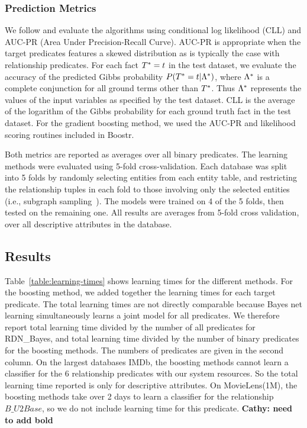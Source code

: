 \documentclass[runningheads,a4paper]{llncs}
\begin{document}
\subsubsection{Prediction Metrics}
We follow \cite{Khot2011} and evaluate the algorithms using conditional log likelihood (CLL) and AUC-PR (Area Under Precision-Recall Curve). AUC-PR is appropriate when the target predicates features a skewed distribution as is typically the case with relationship predicates. %
For each fact $T^{*}\hspace{0.0ex} = t$ in the test dataset, we evaluate the accuracy of the predicted Gibbs probability $P(T^{*}\hspace{0.0ex} = t | \Lambda^{*}\hspace{0.0ex})$, where $\Lambda^{*}\hspace{0.0ex}$ is a complete conjunction for all ground terms other than $T^{*}\hspace{0.0ex}$. Thus $\Lambda^{*}\hspace{0.0ex}$ represents the values of the input variables as specified by the test dataset.
CLL is the average of the logarithm of the Gibbs probability for each ground truth fact in the test dataset. For the gradient boosting method, we used the AUC-PR and likelihood scoring routines included in Boostr.


Both metrics are reported as averages over all binary predicates. The learning methods were evaluated using 5-fold cross-validation. Each database was split into 5 folds by randomly selecting entities from each entity table, and restricting the relationship tuples in each fold to those involving only the selected entities  (i.e., subgraph sampling~\cite{Schulte2012}). The models were trained on 4 of the 5 folds, then tested on the remaining one. All results are averages from 5-fold cross validation, over all descriptive attributes in the database. 


\subsection{Results} 
%
Table~\ref{table:learning-times} shows learning times for the different methods. For the boosting method, we added together the learning times for each target predicate. The total learning times are not directly comparable because Bayes net learning simultaneously learns a joint model for all predicates. We therefore report total learning time divided by the number of all predicates for RDN\_Bayes, and total learning time divided by the number of binary predicates for the boosting methods. The numbers of predicates are given in the second column. On the largest databases IMDb, the boosting methods cannot learn a classifier for the 6 relationship predicates with our system resources. So the total learning time reported is only for descriptive attributes. On MovieLens(1M), the boosting methods take over 2 days to learn a classifier for the relationship $B\_U2Base$, so we do not include learning time for this predicate.
\textbf{Cathy: need to add bold}
\end{document}

